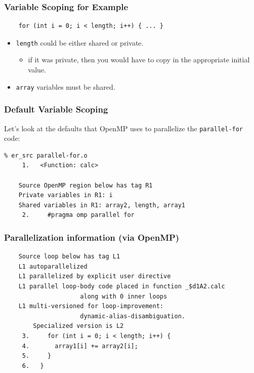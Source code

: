 \begin{frame}[fragile]
  \frametitle{Variable Scoping for Example}

  

\begin{verbatim}
    for (int i = 0; i < length; i++) { ... }
\end{verbatim}

\large
  \begin{itemize}
    \item {\tt length} could be either shared or private.
    \begin{itemize}
      \item if it was private, then you would have to copy
in the appropriate initial value.
    \end{itemize}
    \item {\tt array} variables must be shared.
  \end{itemize}
  

\end{frame}


\begin{frame}[fragile]
  \frametitle{Default Variable Scoping}
  
Let's look at the defaults that OpenMP uses to parallelize the {\tt parallel-for} code:
\begin{lstlisting}
% er_src parallel-for.o
     1.   <Function: calc>
    
    Source OpenMP region below has tag R1
    Private variables in R1: i
    Shared variables in R1: array2, length, array1
     2.     #pragma omp parallel for
\end{lstlisting}
  

\end{frame}


\begin{frame}[fragile]
  \frametitle{Parallelization information (via OpenMP)}
\begin{lstlisting}
    Source loop below has tag L1
    L1 autoparallelized
    L1 parallelized by explicit user directive
    L1 parallel loop-body code placed in function _$d1A2.calc 
                     along with 0 inner loops
    L1 multi-versioned for loop-improvement:
                     dynamic-alias-disambiguation. 
        Specialized version is L2
     3.     for (int i = 0; i < length; i++) {
     4.       array1[i] += array2[i];
     5.     }
     6.   }
\end{lstlisting}

\end{frame}

